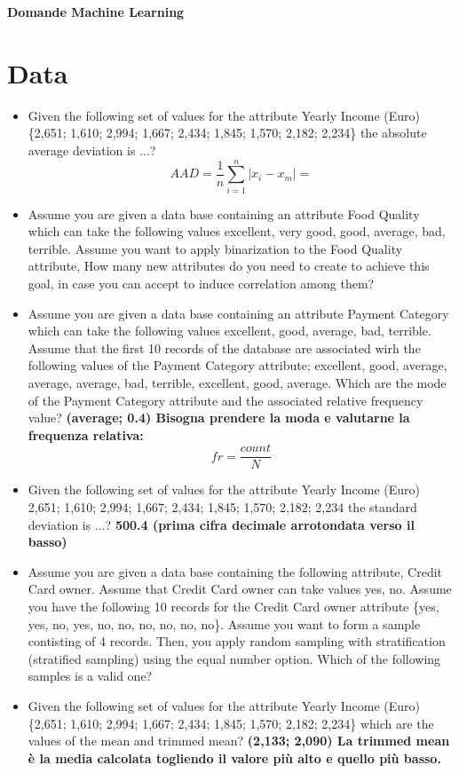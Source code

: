 \documentclass[12pt, a4paper,titlepage,openany]{article}
\begin{document}
	\begin{center}
		\huge\textbf{Domande Machine Learning}
	\end{center}
\section{Data}
\begin{itemize}
	\item Given the following set of values for the attribute Yearly Income (Euro) \{2,651; 1,610; 2,994; 1,667; 2,434; 1,845; 1,570; 2,182; 2,234\} the absolute average deviation is ...? \textbf{\[AAD = \frac{1}{n}\sum_{i=1}^{n}|x_i- x_m| = \]}
	\item Assume you are given a data base containing an attribute Food Quality which can take the following values {excellent, very good, good, average, bad, terrible}. Assume you want to apply binarization to the Food Quality attribute, How many new attributes do you need to create to achieve this goal, in case you can accept to induce correlation among them? \textbf{}
	\item Assume you are given a data base containing an attribute Payment Category which can take the following values {excellent, good, average, bad, terrible}. Assume that the first 10 records of the database are associated wirh the following values of the Payment Category attribute; {excellent, good, average, average, average, bad, terrible, excellent, good, average}. Which are the mode of the Payment Category attribute and the associated relative frequency value? \textbf{(average; 0.4) Bisogna prendere la moda e valutarne la frequenza relativa: \[fr =\frac{count}{N}\]}
	\item Given the following set of values for the attribute Yearly Income (Euro) {2,651; 1,610; 2,994; 1,667; 2,434; 1,845; 1,570; 2,182; 2,234} the standard deviation is ...? \textbf{500.4 (prima cifra decimale arrotondata verso il basso)}
	\item Assume you are given a data base containing the following attribute, Credit Card owner. Assume that Credit Card owner can take values {yes, no}. Assume you have the following 10 records for the Credit Card owner attribute \{yes, yes, no, yes, no, no, no, no, no, no\}. Assume you want to form a sample contisting of 4 records. Then, you apply random sampling with stratification (stratified sampling) using the equal number option. Which of the following samples is a valid one? \textbf{}
	\item Given the following set of values for the attribute Yearly Income (Euro) \{2,651; 1,610; 2,994; 1,667; 2,434; 1,845; 1,570; 2,182; 2,234\} which are the values of the mean and trimmed mean? \textbf{(2,133; 2,090) La trimmed mean è la media calcolata togliendo il valore più alto e quello più basso.}

\end{itemize}
\end{document}
